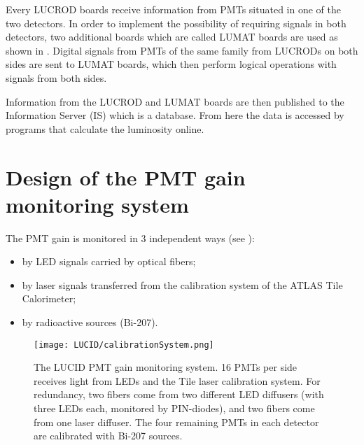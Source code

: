 Every LUCROD boards receive information from PMTs situated in one of the two detectors.
In order to implement the possibility of requiring signals in both detectors, two additional boards which are called LUMAT boards are used
as shown in .
Digital signals from PMTs of the same family from LUCRODs on both sides are sent to LUMAT boards, 
which then perform logical operations with signals from both sides.

Information from the LUCROD and LUMAT boards are then published to the Information Server (IS) which is a database.
From here the data is accessed by programs that calculate the luminosity online.

\section{Design of the PMT gain monitoring system}
\label{sec:pmtGainMonitoringSystem}

The PMT gain is monitored in 3 independent ways (see ):
\begin{itemize}
 \item by LED signals carried by optical fibers;
 \item by laser signals transferred from the calibration system of the ATLAS Tile Calorimeter;
 \item by radioactive sources (Bi-207).
\end{itemize}

\begin{figure}
\centering
\texttt{[image: LUCID/calibrationSystem.png]}
\caption{The LUCID PMT gain monitoring system. 16 PMTs per side receives light from LEDs and the Tile laser calibration 
system. 
For redundancy, two fibers come from two different LED diffusers (with three LEDs each, monitored by 
PIN-diodes), and two fibers come from one laser diffuser. The four remaining PMTs in each detector are calibrated 
with Bi-207 sources.}
\label{fig:calibrationSystem}
\end{figure}


